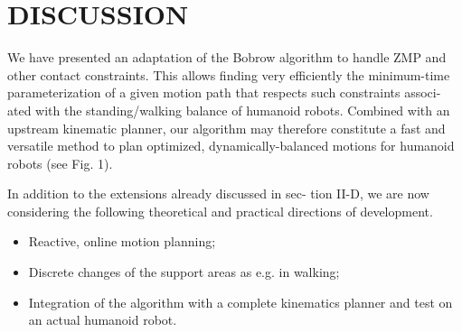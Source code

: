 \documentclass[journal]{IEEEtran}
\begin{document}
\section{DISCUSSION}
We have presented an adaptation of the Bobrow algorithm
to handle ZMP and other contact constraints. This allows
finding very efficiently the minimum-time parameterization
of a given motion path that respects such constraints associ-
ated with the standing/walking balance of humanoid robots.
Combined with an upstream kinematic planner, our algorithm
may therefore constitute a fast and versatile method to
plan optimized, dynamically-balanced motions for humanoid
robots (see Fig. 1).

In addition to the extensions already discussed in sec-
tion II-D, we are now considering the following theoretical
and practical directions of development.

\begin{itemize}
\item Reactive, online motion planning;
\item Discrete changes of the support areas as e.g. in walking;
\item Integration of the algorithm with a complete kinematics
planner and test on an actual humanoid robot.
\end{itemize}
\end{document}
